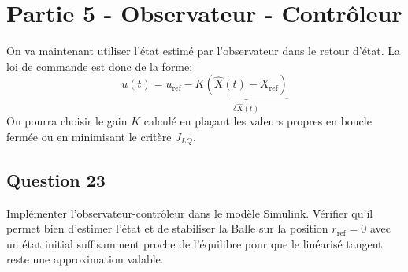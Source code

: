 \documentclass[class=article, crop=false]{standalone}
\begin{document}
\section{Partie 5 - Observateur - Contrôleur}
On va maintenant utiliser l'état estimé par l'observateur dans le retour d'état. La loi de commande est donc de la forme:
\begin{equation}
    u(t) = u_{\text{ref}} - K \underbrace{(\hat{X}(t) - X_{\text{ref}})}_{\delta \hat{X}(t)}
\end{equation}
On pourra choisir le gain $K$ calculé en plaçant les valeurs propres en boucle fermée ou en minimisant le critère $J_{LQ}$.

\newpage
\subsection{Question 23}
\begin{exercise}
    Implémenter l'observateur-contrôleur dans le modèle Simulink. Vérifier qu'il permet bien d'estimer l'état et de stabiliser la Balle sur la position $r_{\text{ref}} = 0$ avec un état initial suffisamment proche de l'équilibre pour que le linéarisé tangent reste une approximation valable.
\end{exercise}
\end{document}
